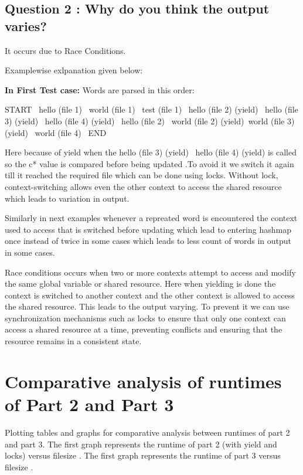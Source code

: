 \documentclass{article}
\begin{document}
\subsection*{Question 2 : Why do you think the output varies?}


It occurs due to Race Conditions.


Examplewise exlpanation given below:

\textbf{In First Test case:} 
Words are parsed in this order:

START \textrightarrow \
hello (file 1) \textrightarrow \ world (file 1) \textrightarrow \ test (file 1) \textrightarrow \ hello (file 2) (yield) \textrightarrow \ hello (file 3) (yield) \textrightarrow \ hello (file 4) (yield) \textrightarrow \ hello (file 2) \textrightarrow \ world (file 2) (yield)\textrightarrow \ world (file 3) (yield) \textrightarrow \ world (file 4) \textrightarrow \ END


Here because of yield when the   hello (file 3) (yield) \textrightarrow \ hello (file 4) (yield) is called  so the c* value is compared before being updated .To avoid it we switch it again till it reached the required file which can be done using locks. Without lock,  context-switching allows even the other context  to access the shared resource which leads to variation in output.


Similarly in next examples whenever a repreated word is encountered the context used to access that  is switched before updating which lead to entering hashmap once instead of twice in some cases which leads to less count of words in output in some cases.


Race conditions occurs when two or more contexts attempt to access and modify the same global variable or shared resource. Here when yielding is done the context is switched to another context and the other context is allowed to access the shared resource. This leads to the output varying.
To prevent it we can use synchronization mechanisms such as locks to ensure that only one context can access a shared resource at a time, preventing conflicts and ensuring that the resource remains in a consistent state.

\section*{Comparative analysis of runtimes of Part 2 and Part 3}

Plotting tables and graphs for comparative analysis between runtimes of part 2 and part 3. The first graph represents the runtime of part 2 (with yield and locks) versus filesize . The first graph represents the runtime of part 3 versus filesize .
\end{document}
